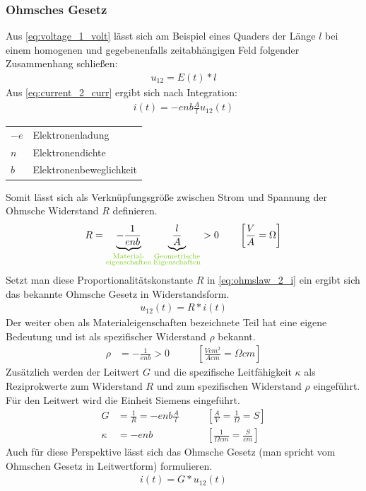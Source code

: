\documentclass[12pt,a4paper]{article}%
\numberwithin{equation}{section}
\def\colGreen#1{\begingroup\color{LimeGreen}{#1}\endgroup}
\begin{document}
\subsubsection{Ohmsches Gesetz}
Aus \eqref{eq:voltage_1_volt} lässt sich am Beispiel eines Quaders der Länge $l$ bei einem homogenen und gegebenenfalls zeitabhängigen Feld folgender Zusammenhang schließen:
\begin{align}
u_{12} = E(t) * l 
\end{align}
Aus \eqref{eq:current_2_curr} ergibt sich nach Integration:
\begin{align}
i(t) = -enb \frac{A}{l} u_{12}(t) \label{eq:ohmslaw_2_i}
\end{align}
\begin{tabular}{p{1cm} p{13.5cm}}
$-e$ & Elektronenladung \\
$n$ & Elektronendichte \\
$b$ & Elektronenbeweglichkeit\\
\end{tabular} 
\newline
\newline
Somit lässt sich als Verknüpfungsgröße zwischen Strom und Spannung der Ohmsche Widerstand $R$ definieren.
\begin{align}
R = \underbrace{-\frac{1}{enb}}_{\substack{\text{\colGreen{Material-}} \\ \text{\colGreen{eigenschaften}}}} 
\underbrace{\frac{l}{A}}_{\substack{\text{\colGreen{Geometrische}} \\ \text{\colGreen{Eigenschaften}}}} > 0 \qquad \left[\frac{V}{A} = \Omega \right]
\end{align}
Setzt man diese Proportionalitätskonstante $R$ in \eqref{eq:ohmslaw_2_i} ein ergibt sich das bekannte Ohmsche Gesetz in Widerstandsform.
\begin{align}
u_{12}(t) = R*i(t) \label{eq:ohmslaw}
\end{align}
Der weiter oben als Materialeigenschaften bezeichnete Teil hat eine eigene Bedeutung und ist als spezifischer Widerstand $\rho$ bekannt. 
\begin{align}
\rho &= -\frac{1}{enb} > 0 \qquad &\left[\frac{Vcm^2}{Acm} = \Omega cm\right] \label{eq:ohmslaw_4_spezR}
\end{align}
Zusätzlich werden der Leitwert $G$ und die spezifische Leitfähigkeit $\kappa$ als Reziprokwerte zum Widerstand $R$ und zum spezifischen Widerstand $\rho$ eingeführt. Für den Leitwert wird die Einheit Siemens eingeführt.
\begin{align}
G &= \frac{1}{R} = -enb\frac{A}{l} \qquad &\left[\frac{A}{V} = \frac{1}{\Omega} = S\right] \\ \nonumber
\kappa &= -enb \qquad &\left[\frac{1}{\Omega cm} = \frac{S}{cm}\right]
\end{align}
Auch für diese Perspektive lässt sich das Ohmsche Gesetz (man spricht vom Ohmschen Gesetz in Leitwertform) formulieren.
\begin{align}
i(t) = G * u_{12}(t) \label{eq:ohmslaw_lw}
\end{align}
\end{document}
